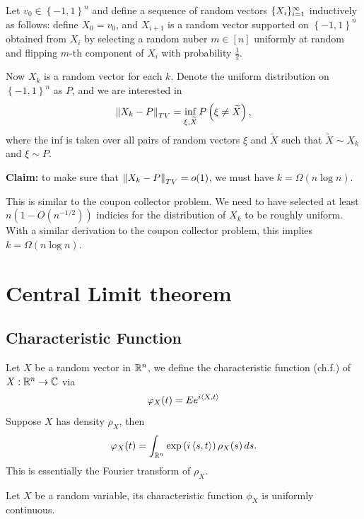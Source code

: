 \documentclass[a4paper]{article}
\begin{document}
\begin{eg}
  Let $v_0 \in \left\{ -1, 1 \right\}^n$ and define a sequence
  of random vectors $\{ X_i \}_{i=1}^\infty$ inductively as follows:
  define $X_0 = v_0$, and $X_{i + 1}$ is a random vector supported
  on $\left\{ -1, 1 \right\}^n$ obtained from $X_i$ by selecting
  a random nuber $m \in [n]$ uniformly at random and flipping
  $m$-th component of $X_i$ with probability $\frac{1}{2}$.

  Now $X_k$ is a random vector for each $k$.
  Denote the uniform distribution on $\left\{ -1, 1 \right\}^n$
  as $P$, and we are interested in
  \[
    \left\lVert X_k - P\right\rVert_{TV}
    = \inf_{\xi, \widetilde{X}} P \left( \xi \neq \widetilde{X} \right),
  \]
  where the inf is taken over all pairs of random vectors
  $\xi$ and $\tilde{X}$ such that $\tilde{X} \sim X_k$ and
  $\xi \sim P$.

  \textbf{Claim:} to make sure that $\left\lVert X_k - P\right\rVert_{TV} = o(1)$,
  we must have $k = \Omega (n \log n)$.

  This is similar to the coupon collector problem. We need to have selected
  at least $n (1 - O( n^{-1/2} ))$ indicies for the distribution
  of $X_k$ to be roughly uniform. With a similar derivation
  to the coupon collector problem, this implies $k = \Omega (n \log n)$.


\end{eg}

\section{Central Limit theorem}

\subsection{Characteristic Function}

\begin{defi}
  Let $X$ be a random vector in $\mathbb{R}^n$, we define the
  characteristic function (ch.f.) of $X : \mathbb{R}^n \to \mathbb{C}$ via
  \[
    \varphi_X (t) = E e^{i \left\langle X, t \right\rangle}
  \]
  Suppose $X$ has density $\rho_X$, then
  \[
    \varphi_X (t) = \int_{\mathbb{R}^n} \exp \left( i \left\langle s, t \right\rangle \right)
    \rho_X (s) \, d s.
  \]
  This is essentially the Fourier transform of $\rho_X$.
\end{defi}

\begin{prop}
  Let $X$ be a random variable, its characteristic function
  $\phi_X$ is uniformly continuous.
\end{prop}
\end{document}
